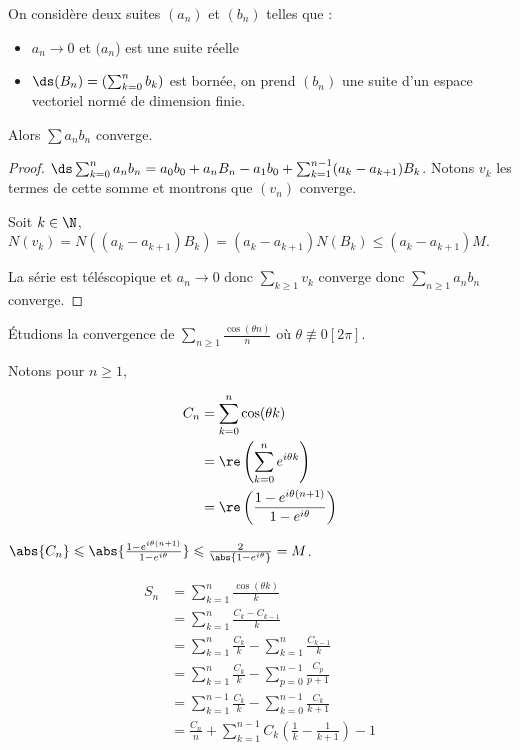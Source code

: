 \begin{theoreme}{}{}
    On considère deux suites $(a_n)$ et $(b_n)$ telles que :
    \begin{itemize}
        \item $a_n \to 0$ et $(a_n$) est une suite réelle
        \item $\ds (B_n) = \left(\sum_{k=0}^n b_k\right)$ est bornée, on prend $(b_n)$ une suite d'un espace vectoriel normé de dimension finie.
    \end{itemize}

    Alors $\sum a_n b_n$ converge.
\end{theoreme}

\begin{proof}
$\ds \sum_{k=0}^n a_n b_n = a_0 b_0 + a_n B_n - a_1 b_0 + \sum_{k=1}^{n-1} (a_k - a_{k+1}) B_k$. Notons $v_k$ les termes de cette somme et montrons que $(v_n)$ converge.

Soit $k \in \N$, $N(v_k) = N((a_k - a_{k+1}) B_k) = (a_k - a_{k+1}) N(B_k) \leqslant (a_{k} - a_{k+1}) M$.

La série est téléscopique et $a_n \to 0$ donc $\sum_{k\geqslant 1} v_k$ converge donc $\sum_{n \geqslant 1} a_n b_n$ converge.
\end{proof}

Étudions la convergence de $\sum_{n \geqslant 1} \frac{\cos(\theta n)}{n}$ où $\theta \not \equiv 0 [2\pi]$.

Notons pour $n \geqslant 1, $

\begin{align*}
    C_n & = \sum_{k = 0}^{n} \cos(\theta k) \\
        & = \re \left( \sum_{k = 0}^{n} e^{i \theta k} \right) \\
        & = \re \left( \frac{1 - e^{i \theta (n + 1)}}{1 - e^{i \theta}} \right) 
\end{align*}

$\abs{C_n} \leqslant \abs{\frac{1 - e^{i \theta (n + 1)}}{1 - e^{i \theta}}} \leqslant \frac{2}{\abs{1 - e^{i \theta}}} = M$.

{\allowdisplaybreaks
\begin{align*}
    S_n & = \sum_{k = 1}^{n} \frac{\cos(\theta k)}{k} \\
        & = \sum_{k = 1}^{n} \frac{C_k - C_{k - 1}}{k} \\
        & = \sum_{k = 1}^{n} \frac {C_k} k - \sum_{k = 1}^{n} \frac{C_{k - 1}}{k} \\
        & = \sum_{k = 1}^{n} \frac{C_k}{k} - \sum_{p = 0}^{n - 1} \frac{C_p}{p + 1} \\
        & = \sum_{k = 1}^{n - 1} \frac{C_k}{k} - \sum_{k = 0 }^{n - 1 } \frac{C_k}{k + 1} \\
        & = \frac{C_n} n + \sum_{k = 1}^{n - 1} C_k \left( \frac 1 k - \frac 1 {k + 1} \right) - 1 
\end{align*}
}

